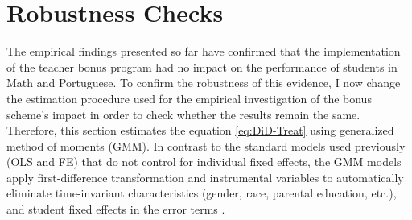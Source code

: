 \documentclass[a4paper, 12pt]{article}
\begin{document}
{%













\section{Robustness Checks} \label{Robustness}

The empirical findings presented so far have confirmed that the implementation of the teacher bonus program had no impact on the performance of students in Math and Portuguese. To confirm the robustness of this evidence, I now change the estimation procedure used for the empirical investigation of the bonus scheme’s impact in order to check whether the results remain the same. Therefore, this section estimates the equation \eqref{eq:DiD-Treat} using generalized method of moments (GMM). In contrast to the standard models used previously (OLS and FE) that do not control for individual fixed effects, the GMM models apply first-difference transformation and instrumental variables to automatically eliminate time-invariant characteristics (gender, race, parental education, etc.), and student fixed effects in the error terms \citep[see e.g.][]{kripfganz2019estimation, wooldridge2016introductory}.












}
\end{document}
